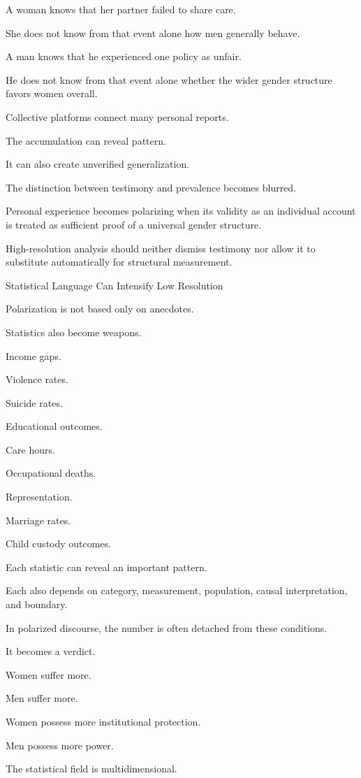 A woman knows that her partner failed to share care.

She does not know from that event alone how men generally behave.

A man knows that he experienced one policy as unfair.

He does not know from that event alone whether the wider gender structure favors women overall.

Collective platforms connect many personal reports.

The accumulation can reveal pattern.

It can also create unverified generalization.

The distinction between testimony and prevalence becomes blurred.

Personal experience becomes polarizing when its validity as an individual account is treated as sufficient proof of a universal gender structure.

High-resolution analysis should neither dismiss testimony nor allow it to substitute automatically for structural measurement.

Statistical Language Can Intensify Low Resolution

Polarization is not based only on anecdotes.

Statistics also become weapons.

Income gaps.

Violence rates.

Suicide rates.

Educational outcomes.

Care hours.

Occupational deaths.

Representation.

Marriage rates.

Child custody outcomes.

Each statistic can reveal an important pattern.

Each also depends on category, measurement, population, causal interpretation, and boundary.

In polarized discourse, the number is often detached from these conditions.

It becomes a verdict.

Women suffer more.

Men suffer more.

Women possess more institutional protection.

Men possess more power.

The statistical field is multidimensional.

